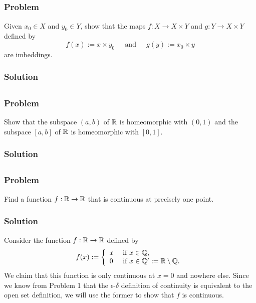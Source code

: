 \subsection{}

\subsubsection{Problem}
Given $x_0 \in X$ and $y_0 \in Y$, show that the maps $f : X \to X \times Y$ and $g : Y \to X \times Y$ defined by
\[ f(x) := x \times y_0 ~~~~~\mbox{ and }~~~~~ g(y) := x_0 \times y \]
are imbeddings.

\subsubsection{Solution}
\todo


\subsection{}

\subsubsection{Problem}
Show that the subspace $(a, b)$ of $\mathbb R$ is homeomorphic with $(0, 1)$ and the subspace $[a, b]$ of $\mathbb R$ is homeomorphic with $[0, 1]$.

\subsubsection{Solution}
\todo


\setcounter{subsection}{5} %
\subsection{}

\subsubsection{Problem}
Find a function $f : \mathbb R \to \mathbb R$ that is continuous at precisely one point.

\subsubsection{Solution}
Consider the function $f : \mathbb R \to \mathbb R$ defined by
\[
    f(x) := \left\{ \begin{array}{ll}
        x & \mbox{ if } x \in \mathbb Q, \\
        0 & \mbox{ if } x \in \mathbb Q' := \mathbb R\setminus\mathbb Q.
    \end{array} \right.
\]
We claim that this function is only continuous at $x = 0$ and nowhere else. Since we know from Problem 1 that the $\epsilon$-$\delta$ definition of continuity is equivalent to the open set definition, we will use the former to show that $f$ is continuous.

